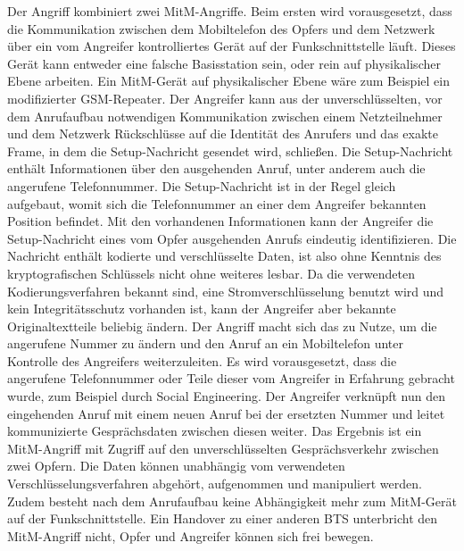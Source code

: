 Der Angriff kombiniert zwei \ac{MitM}-Angriffe. Beim ersten wird vorausgesetzt, dass die Kommunikation zwischen dem Mobiltelefon des Opfers und dem Netzwerk über ein vom Angreifer kontrolliertes Gerät auf der Funkschnittstelle läuft. Dieses Gerät kann entweder eine falsche Basisstation sein, oder rein auf physikalischer Ebene arbeiten. Ein \ac{MitM}-Gerät auf physikalischer Ebene wäre zum Beispiel ein modifizierter \ac{GSM}-Repeater. Der Angreifer kann aus der unverschlüsselten, vor dem Anrufaufbau notwendigen Kommunikation zwischen einem Netzteilnehmer und dem Netzwerk Rückschlüsse auf die Identität des Anrufers und das exakte Frame, in dem die Setup-Nachricht gesendet wird, schließen. Die Setup-Nachricht enthält Informationen über den ausgehenden Anruf, unter anderem auch die angerufene Telefonnummer. Die Setup-Nachricht ist in der Regel gleich aufgebaut, womit sich die Telefonnummer an einer dem Angreifer bekannten Position befindet. Mit den vorhandenen Informationen kann der Angreifer die Setup-Nachricht eines vom Opfer ausgehenden Anrufs eindeutig identifizieren. Die Nachricht enthält kodierte und verschlüsselte Daten, ist also ohne Kenntnis des kryptografischen Schlüssels nicht ohne weiteres lesbar. Da die verwendeten Kodierungsverfahren bekannt sind, eine Stromverschlüsselung benutzt wird und kein Integritätsschutz vorhanden ist, kann der Angreifer aber bekannte Originaltextteile beliebig ändern. Der Angriff macht sich das zu Nutze, um die angerufene Nummer zu ändern und den Anruf an ein Mobiltelefon unter Kontrolle des Angreifers weiterzuleiten. Es wird vorausgesetzt, dass die angerufene Telefonnummer oder Teile dieser vom Angreifer in Erfahrung gebracht wurde, zum Beispiel durch Social Engineering. Der Angreifer verknüpft nun den eingehenden Anruf mit einem neuen Anruf bei der ersetzten Nummer und leitet kommunizierte Gesprächsdaten zwischen diesen weiter. Das Ergebnis ist ein \ac{MitM}-Angriff mit Zugriff auf den unverschlüsselten Gesprächsverkehr zwischen zwei Opfern. Die Daten können unabhängig vom verwendeten Verschlüsselungsverfahren abgehört, aufgenommen und manipuliert werden. Zudem besteht nach dem Anrufaufbau keine Abhängigkeit mehr zum \ac{MitM}-Gerät auf der Funkschnittstelle. Ein Handover zu einer anderen \ac{BTS} unterbricht den \ac{MitM}-Angriff nicht, Opfer und Angreifer können sich frei bewegen.

